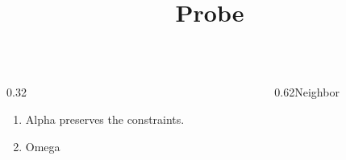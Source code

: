 \documentclass[11pt,aspectratio=43]{beamer}
\title{Probe}
\date{}
\begin{document}
\begin{frame}\begin{columns}[onlytextwidth,T]\begin{column}{0.32\textwidth}\begin{enumerate}\item<1-> Alpha preserves the constraints.\item<2-> \par Omega\end{enumerate}\end{column}\begin{column}{0.62\textwidth}Neighbor\end{column}\end{columns}\end{frame}
\end{document}
